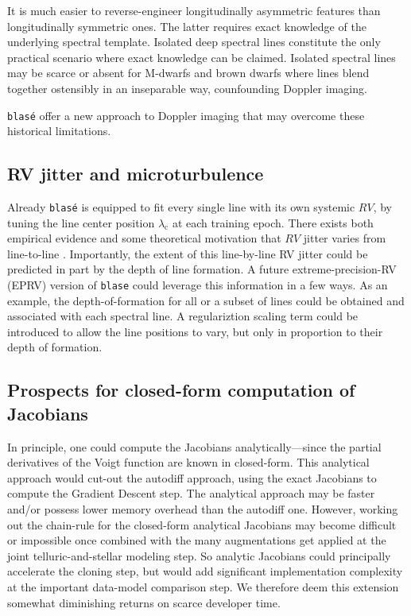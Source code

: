 \documentclass[modern]{aastex631}
\begin{document}
It is much easier to reverse-engineer longitudinally asymmetric features than longitudinally symmetric ones.  The latter requires exact knowledge of the underlying spectral template.  Isolated deep spectral lines constitute the only practical scenario where exact knowledge can be claimed.  Isolated spectral lines may be scarce or absent for M-dwarfs and brown dwarfs where lines blend together ostensibly in an inseparable way, counfounding Doppler imaging.

\texttt{blas\'e} offer a new approach to Doppler imaging that may overcome these historical limitations.


\subsection{RV jitter and microturbulence}

Already \texttt{blas\'e} is equipped to fit every single line with its own systemic $RV$, by tuning the line center position $\lambda_\mathrm{c}$ at each training epoch.  There exists both empirical evidence and some theoretical motivation that $RV$ jitter varies from line-to-line .  Importantly, the extent of this line-by-line RV jitter could be predicted in part by the depth of line formation.  A future extreme-precision-RV (EPRV) version of \texttt{blase} could leverage this information in a few ways.  As an example, the depth-of-formation for all or a subset of lines could be obtained and associated with each spectral line.  A regulariztion scaling term could be introduced to allow the line positions to vary, but only in proportion to their depth of formation.


\subsection{Prospects for closed-form computation of Jacobians}
In principle, one could compute the Jacobians analytically---since the partial derivatives of the Voigt function are known in closed-form.  This analytical approach would cut-out the autodiff approach, using the exact Jacobians to compute the Gradient Descent step.  The analytical approach may be faster and/or possess lower memory overhead than the autodiff one.  However, working out the chain-rule for the closed-form analytical Jacobians may become difficult or impossible once combined with the many augmentations get applied at the joint telluric-and-stellar modeling step.  So analytic Jacobians could principally accelerate the cloning step, but would add significant implementation complexity at the important data-model comparison step.  We therefore deem this extension somewhat diminishing returns on scarce developer time.
\end{document}
